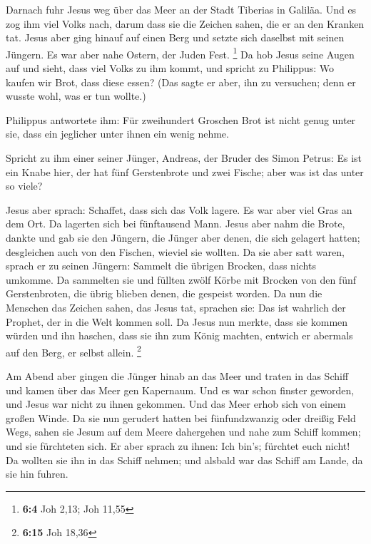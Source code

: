  Darnach fuhr Jesus weg über das Meer an der Stadt
Tiberias in Galiläa.  Und es zog ihm viel Volks nach,
darum dass sie die Zeichen sahen, die er an den Kranken tat.
 Jesus aber ging hinauf auf einen Berg und setzte sich
daselbst mit seinen Jüngern.  Es war aber nahe Ostern, der
Juden Fest. \footnote{\textbf{6:4} Joh 2,13; Joh 11,55} 
Da hob Jesus seine Augen auf und sieht, dass viel Volks zu ihm kommt,
und spricht zu Philippus: Wo kaufen wir Brot, dass diese essen?
 (Das sagte er aber, ihn zu versuchen; denn er wusste
wohl, was er tun wollte.)

 Philippus antwortete ihm: Für zweihundert Groschen Brot
ist nicht genug unter sie, dass ein jeglicher unter ihnen ein wenig
nehme.

 Spricht zu ihm einer seiner Jünger, Andreas, der Bruder
des Simon Petrus:  Es ist ein Knabe hier, der hat fünf
Gerstenbrote und zwei Fische; aber was ist das unter so viele?

 Jesus aber sprach: Schaffet, dass sich das Volk lagere.
Es war aber viel Gras an dem Ort. Da lagerten sich bei fünftausend Mann.
 Jesus aber nahm die Brote, dankte und gab sie den
Jüngern, die Jünger aber denen, die sich gelagert hatten; desgleichen
auch von den Fischen, wieviel sie wollten.  Da sie aber
satt waren, sprach er zu seinen Jüngern: Sammelt die übrigen Brocken,
dass nichts umkomme.  Da sammelten sie und füllten zwölf
Körbe mit Brocken von den fünf Gerstenbroten, die übrig blieben denen,
die gespeist worden.  Da nun die Menschen das Zeichen
sahen, das Jesus tat, sprachen sie: Das ist wahrlich der Prophet, der in
die Welt kommen soll.  Da Jesus nun merkte, dass sie
kommen würden und ihn haschen, dass sie ihn zum König machten, entwich
er abermals auf den Berg, er selbst allein. \footnote{\textbf{6:15} Joh
  18,36}

 Am Abend aber gingen die Jünger hinab an das Meer
 und traten in das Schiff und kamen über das Meer gen
Kapernaum. Und es war schon finster geworden, und Jesus war nicht zu
ihnen gekommen.  Und das Meer erhob sich von einem großen
Winde.  Da sie nun gerudert hatten bei fünfundzwanzig
oder dreißig Feld Wegs, sahen sie Jesum auf dem Meere dahergehen und
nahe zum Schiff kommen; und sie fürchteten sich.  Er aber
sprach zu ihnen: Ich bin's; fürchtet euch nicht!  Da
wollten sie ihn in das Schiff nehmen; und alsbald war das Schiff am
Lande, da sie hin fuhren.

